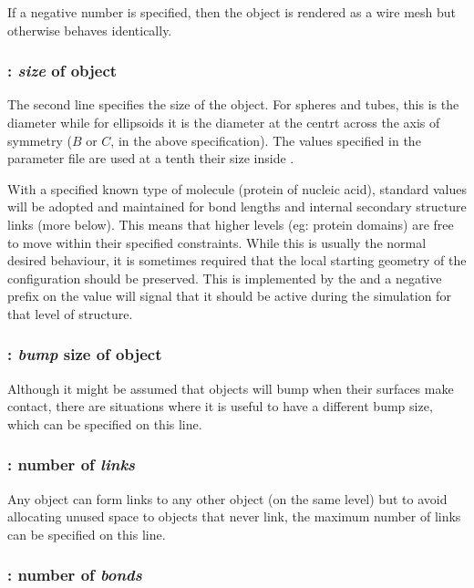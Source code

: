 If a negative number is specified, then the object is rendered as a wire mesh but otherwise
behaves identically.

\subsubsection{: {\em size} of object}

The second line specifies the size of the object.  For spheres and tubes, this is the diameter
while for ellipsoids it is the diameter at the centrt across the axis of symmetry ($B$ or $C$,
in the above specification).   The values specified in the parameter file are used at a tenth
their size inside \NAME.

With a specified known type of molecule (protein of nucleic acid), standard values will be
adopted and maintained for bond lengths and internal secondary structure links (more below).
This means that higher levels (eg: protein domains) are free to move within their specified
constraints.  While this is usually the normal desired behaviour, it is sometimes required
that the local starting geometry of the configuration should be preserved.  This is implemented
by the  and a negative prefix on the  value will signal that it should be
active during the simulation for that level of structure. 

\subsubsection{: {\em bump} size of object}

Although it might be assumed that objects will bump when their surfaces make contact,
there are situations where it is useful to have a different bump size, which can be specified
on this line.

\subsubsection{: number of {\em links}}

Any object can form links to any other object (on the same level) but to avoid allocating unused
space to objects that never link, the maximum number of links can be specified on this line. 

\subsubsection{: number of {\em bonds}}

